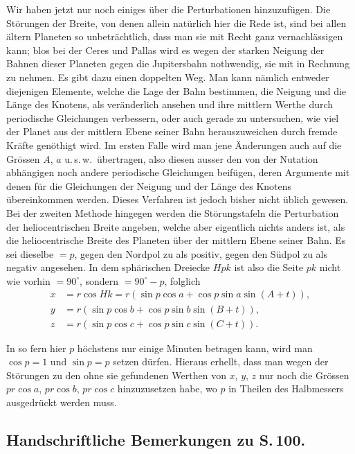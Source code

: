 \documentclass[12pt,a4paper]{article}
\begin{document}
Wir haben jetzt nur noch einiges über die Perturbationen hinzuzufügen.
Die Störungen der Breite, von denen allein natürlich hier die Rede ist, sind
bei allen ältern Planeten so unbeträchtlich, dass man sie mit Recht ganz
vernachlässigen kann; blos bei der Ceres und Pallas wird es wegen der starken Neigung
der Bahnen dieser Planeten gegen die Jupitersbahn nothwendig, sie mit in
Rechnung zu nehmen. Es gibt dazu einen doppelten Weg. Man kann nämlich
entweder diejenigen Elemente, welche die Lage der Bahn bestimmen, die Neigung
und die Länge des Knotens, als veränderlich ansehen und ihre mittlern
Werthe durch periodische Gleichungen verbessern, oder auch gerade zu untersuchen,
wie viel der Planet aus der mittlern Ebene seiner Bahn herauszuweichen
durch fremde Kräfte genöthigt wird. Im ersten Falle wird man jene
Änderungen auch auf die Grössen $A$, $a$ u.\,s.\,w.\ übertragen, also diesen ausser
den von der Nutation abhängigen noch andere periodische Gleichungen beifügen,
deren Argumente mit denen für die Gleichungen der Neigung und der Länge des
Knotens übereinkommen werden. Dieses Verfahren ist jedoch bisher nicht üblich
gewesen. Bei der zweiten Methode hingegen werden die Störungstafeln die
Perturbation der heliocentrischen Breite angeben, welche aber eigentlich nichts
anders ist, als die heliocentrische Breite des Planeten über der mittlern
Ebene seiner Bahn. Es sei dieselbe $= p$, gegen den Nordpol zu als positiv,
gegen den Südpol zu als negativ angesehen. In dem sphärischen Dreiecke $Hpk$
ist also die Seite $pk$ nicht wie vorhin $= 90^{\circ}$, sondern $= 90^{\circ} - p$,
folglich
\begin{align*}
x &= r\cos Hk = r(\sin p \cos a + \cos p \sin a \sin(A+t)),\\
y &= r(\sin p \cos b + \cos p \sin b \sin(B+t)),\\
z &= r(\sin p \cos c + \cos p \sin c \sin(C+t)).
\end{align*}

In so fern hier $p$ höchstens nur einige Minuten betragen kann, wird man
$\cos p = 1$ und $\sin p = p$ setzen dürfen. Hieraus erhellt, dass man wegen der
Störungen zu den ohne sie gefundenen Werthen von $x$, $y$, $z$ nur noch die
Grössen $pr\cos a$, $pr\cos b$, $pr\cos c$ hinzuzusetzen habe, wo $p$ in Theilen des
Halbmessers ausgedrückt werden muss.

\subsection{Handschriftliche Bemerkungen zu S.\,100.}
\end{document}
